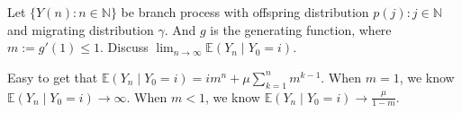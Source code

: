 \documentclass{ctexart}
\begin{document}
\begin{problem}\label{pro:6}
  Let \(\{Y(n): n \in \mathbb{N}\}\) be branch process with offspring distribution \(p(j): j \in \mathbb{N}\) and migrating distribution \(\gamma\).
  And \(g\) is the generating function, where \(m :=g' (1) \leq 1\).
  Discuss \(\lim_{n \to \infty}\mathbb{E}(Y_n \mid Y_0=i)\).
\end{problem}
\begin{solution}
  Easy to get that \(\mathbb{E}(Y_n \mid Y_0=i)=im^n+\mu \sum_{k=1}^{n} m^{k-1}\).
  When \(m=1\), we know \(\mathbb{E}(Y_n \mid Y_0=i) \to \infty\).
  When \(m<1\), we know \(\mathbb{E}(Y_n \mid Y_0=i)\to \frac{\mu}{1-m}\).
\end{solution}
\end{document}
